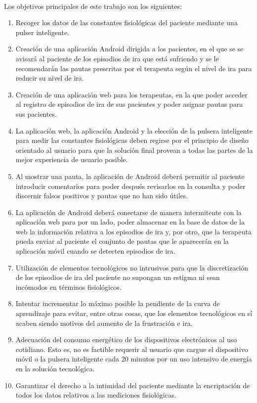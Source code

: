 \paragraph{}
Los objetivos principales de este trabajo son los siguientes:
\begin{enumerate}
    \item Recoger los datos de las constantes fisiológicas del paciente mediante una pulser inteligente.
    \item Creación de una aplicación Android dirigida a los pacientes, en el que se se avisará al paciente de los episodios de ira que está sufriendo y se le recomendarán las pautas prescritas por el terapeuta según el nivel de ira para reducir su nivel de ira.
    \item Creación de una aplicación web para los terapeutas, en la que poder acceder al registro de episodios de ira de sus pacientes y poder asignar pautas para sus pacientes.
    \item La aplicación web, la aplicación Android y la elección de la pulsera inteligente para medir las constantes fisiológicas deben regirse por el principio de diseño orientado al usuario para que la solución final provean a todas las partes de la mejor experiencia de usuario posible.
    \item Al mostrar una pauta, la aplicación de Android deberá permitir al paciente introducir comentarios para poder después revisarlos en la consulta y poder discernir falsos positivos y pautas que no han sido útiles.
    \item La aplicación de Android deberá conectarse de manera intermitente con la aplicación web para por un lado, poder almacenar en la base de datos de la web la información relativa a los episodios de ira y, por otro, que la terapeuta pueda enviar al paciente el conjunto de pautas que le aparecerán en la aplicación móvil cuando se detecten episodios de ira.
    \item Utilización de elementos tecnológicos no intrusivos para que la discretización de los episodios de ira del paciente no supongan un estigma ni sean incómodos en términos fisiológicos.
    \item Intentar incrementar lo máximo posible la pendiente de la curva de aprendizaje para evitar, entre otras cosas, que los elementos tecnológicos en sí acaben siendo motivos del aumento de la frustración e ira.
    \item Adecuación del consumo energético de los dispositivos electrónicos al uso cotidiano. Esto es, no es factible requerir al usuario que cargue el dispositivo móvil o la pulsera inteligente cada 20 minutos por un uso intensivo de energía en la solución tecnológica.
    \item Garantizar el derecho a la intimidad del paciente mediante la encriptación de todos los datos relativos a las mediciones fisiológicas.
\end{enumerate}

